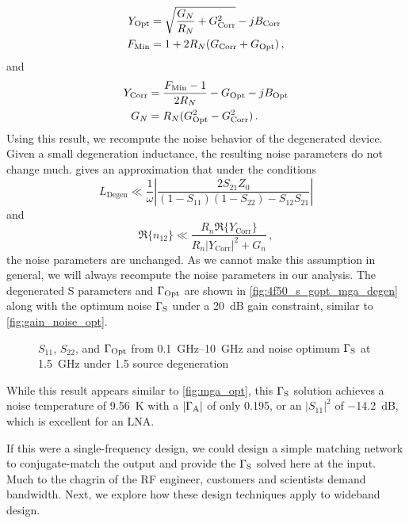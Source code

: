 %
\begin{align}
    Y_\text{Opt} &= \sqrt{\frac{G_N}{R_N}+G_\text{Corr}^2} - jB_\text{Corr} \\
    F_{\text{Min}} &= 1 + 2R_N(G_\text{Corr} + G_\text{Opt})\,,
\end{align}
%
and
%
\begin{align}
    Y_\text{Corr} &= \frac{F_{\text{Min}} - 1}{2R_N} - G_\text{Opt} - jB_\text{Opt} \\
    G_N &= R_N(G_\text{Opt}^2 - G_\text{Corr}^2)\,.
\end{align}
%
Using this result, we recompute the noise behavior of the degenerated device.
Given a small degeneration inductance, the resulting noise parameters do not change much.
\cite{hartmannChangesFourNoise1973} gives an approximation that under the conditions
\begin{equation}
    L_\text{Degen} \ll \frac{1}{\omega}\left| \frac{2S_{21}Z_0}{(1-S_{11})(1-S_{22})-S_{12}S_{21}} \right|
\end{equation}
and
\begin{equation}
    \Re\{n_{12}\} \ll \frac{R_n\Re\{Y_\text{Corr}\}}{R_n|Y_\text{Corr}|^2+G_n}\,,
\end{equation}
the noise parameters are unchanged.
As we cannot make this assumption in general, we will always recompute the noise parameters in our analysis.
The degenerated S parameters and $\Gamma_{\text{Opt}}$ are shown in \autoref{fig:4f50_s_gopt_mga_degen} along with the optimum noise $\Gamma_{\text{S}}$ under a \qty{20}{\dB} gain constraint, similar to \autoref{fig:gain_noise_opt}.
%
\begin{figure}[ht!]%
    \centering
    \subfloat{}%
    \subfloat{}%
    \caption{$S_{11}$, $S_{22}$, and $\Gamma_{\text{Opt}}$ from \SIrange{0.1}{10}{\GHz} and noise optimum $\Gamma_{\text{S}}$ at \qty{1.5}{\GHz} under \qty{1.5}{\nH} source degeneration}%
    \label{fig:4f50_s_gopt_mga_degen}%
\end{figure}

While this result appears similar to \autoref{fig:mga_opt}, this $\Gamma_{\text{S}}$ solution achieves a noise temperature of \qty{9.56}{\K} with a $|\Gamma_{\text{A}}|$ of only \num{0.195}, or an $|S_{11}|^2$ of \qty{-14.2}{\dB}, which is excellent for an LNA.

If this were a single-frequency design, we could design a simple matching network to conjugate-match the output and provide the $\Gamma_{\text{S}}$ solved here at the input.
Much to the chagrin of the RF engineer, customers and scientists demand bandwidth.
Next, we explore how these design techniques apply to wideband design.

